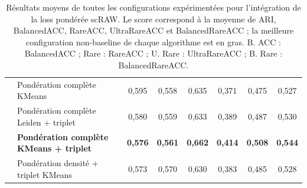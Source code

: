 \begin{table}[H]
\begin{tabularx}{\textwidth}{l X c c c c c c}
 & Pondération complète KMeans & 0,595 & 0,558 & 0,635 & 0,371 & 0,475 & 0,527 \\
 & Pondération complète Leiden + triplet & 0,580 & 0,559 & 0,633 & 0,389 & 0,487 & 0,530 \\
 & \textbf{Pondération complète KMeans + triplet} & \textbf{0,576} & \textbf{0,561} & \textbf{0,662} & \textbf{0,414} & \textbf{0,508} & \textbf{0,544} \\
 & Pondération densité + triplet KMeans & 0,573 & 0,570 & 0,630 & 0,383 & 0,485 & 0,528 \\
\bottomrule
\end{tabularx}
\caption[Toutes les configurations du transfert de loss]{Résultats moyens de toutes les configurations expérimentées pour l'intégration de la loss pondérée scRAW. Le score correspond à la moyenne de ARI, BalancedACC, RareACC, UltraRareACC et BalancedRareACC ; la meilleure configuration non-baseline de chaque algorithme est en gras. B. ACC : BalancedACC ; Rare : RareACC ; U. Rare : UltraRareACC ; B. Rare : BalancedRareACC.}
\label{tab:loss_transfer_all_configurations}
\end{table}
